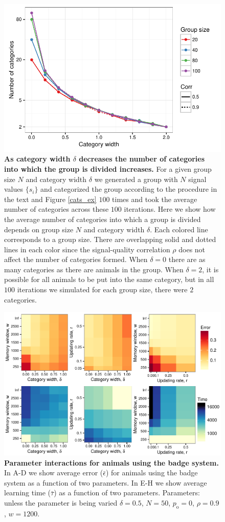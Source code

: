 \begin{figure}[ht]
\includegraphics[width=.8\textwidth]{figures/number_of_categories.pdf}
\caption{\sffamily\small\textbf{As category width $\delta$ decreases the number of categories into which the group is divided increases.}
For a given group size $N$ and category width $\delta$ we generated a group with $N$ signal values $\{s_i\}$ and categorized the group according to the procedure in the text and Figure \ref{cats_ex} $100$ times and took the average number of categories across these $100$ iterations. Here we show how the average number of categories into which a group is divided depends on group size $N$ and category width $\delta$.  Each colored line corresponds to a group size. There are overlapping solid and dotted lines in each color since the signal-quality correlation $\rho$ does not affect the number of categories formed. When $\delta=0$ there are as many categories as there are animals in the group. When $\delta=2$, it is possible for all animals to be put into the same category, but in all $100$ iterations we simulated for each group size, there were $2$ categories. }
\label{num_cat}
\end{figure}



\begin{figure}[ht]
\includegraphics[width=.8\textwidth]{figures/parameters_interactions_full.pdf}
\caption{\sffamily\small\textbf{Parameter interactions for animals using the badge system.}
In A-D we show average error ($\bar{\epsilon}$) for animals using the badge system as a function of two parameters. In E-H we show average learning time ($\bar{\tau}$) as a function of two parameters. Parameters: unless the parameter is being varied $\delta = 0.5$, $N=50$, $p_\text{o}=0$, $\rho=0.9$, $w=1200$.}
\label{interactions_badge}
\end{figure}


